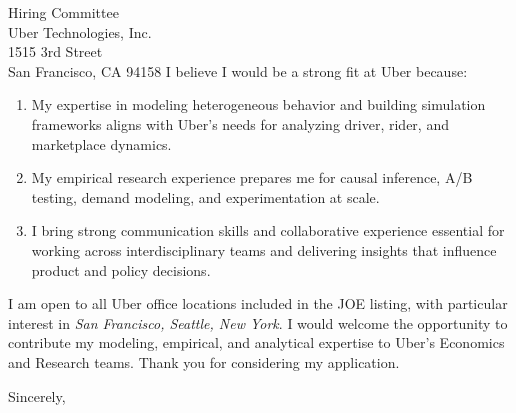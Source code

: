 \documentclass[11pt,letterpaper]{letter}
\begin{document}
\begin{letter}{Hiring Committee \\
Uber Technologies, Inc. \\
1515 3rd Street \\
San Francisco, CA 94158}
I believe I would be a strong fit at Uber because:
\begin{enumerate}
    \item My expertise in modeling heterogeneous behavior and building simulation frameworks aligns with Uber’s needs for analyzing driver, rider, and marketplace dynamics.
    \item My empirical research experience prepares me for causal inference, A/B testing, demand modeling, and experimentation at scale.
    \item I bring strong communication skills and collaborative experience essential for working across interdisciplinary teams and delivering insights that influence product and policy decisions.
\end{enumerate}

I am open to all Uber office locations included in the JOE listing, with particular interest in \textit{San Francisco, Seattle, New York}. I would welcome the opportunity to contribute my modeling, empirical, and analytical expertise to Uber’s Economics and Research teams. Thank you for considering my application.

\closing{Sincerely,}

\end{letter}
\end{document}
